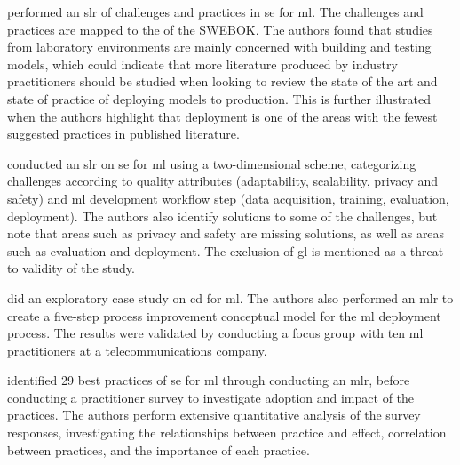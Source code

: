 \textcite{Nascimento2020} performed an \acrshort{slr} of challenges and practices in \acrshort{se} for \acrshort{ml}. The challenges and practices are mapped to the  of the SWEBOK.
The authors found that studies from laboratory environments are mainly concerned with building and testing models, which could indicate that more literature produced by industry practitioners should be studied when looking to review the state of the art and state of practice of deploying models to production.
This is further illustrated when the authors highlight that deployment is one of the areas with the fewest suggested practices in published literature.

\textcite{Lwakatare2020} conducted an \acrshort{slr} on  \acrshort{se} for \acrshort{ml} using a two-dimensional scheme, categorizing challenges according to quality attributes (adaptability, scalability, privacy and safety) and \acrshort{ml} development workflow step (data acquisition, training, evaluation, deployment).
The authors also identify solutions to some of the challenges, but note that areas such as privacy and safety are missing solutions, as well as areas such as evaluation and deployment.
The exclusion of \acrfull{gl} is mentioned as a threat to validity of the study.

\textcite{Lwakatare2020a} did an exploratory case study on \acrshort{cd} for \acrshort{ml}.
The authors also performed an \acrshort{mlr} to create a five-step process improvement conceptual model for the \acrshort{ml} deployment process. 
The results were validated by conducting a focus group with ten \acrshort{ml} practitioners at a telecommunications company.

\textcite{Serban2020} identified 29 best practices of \acrshort{se} for \acrshort{ml} through conducting an \acrshort{mlr}, before conducting a practitioner survey to investigate adoption and impact of the practices.
The authors perform extensive quantitative analysis of the survey responses, investigating the relationships between practice and effect, correlation between practices, and the importance of each practice.


